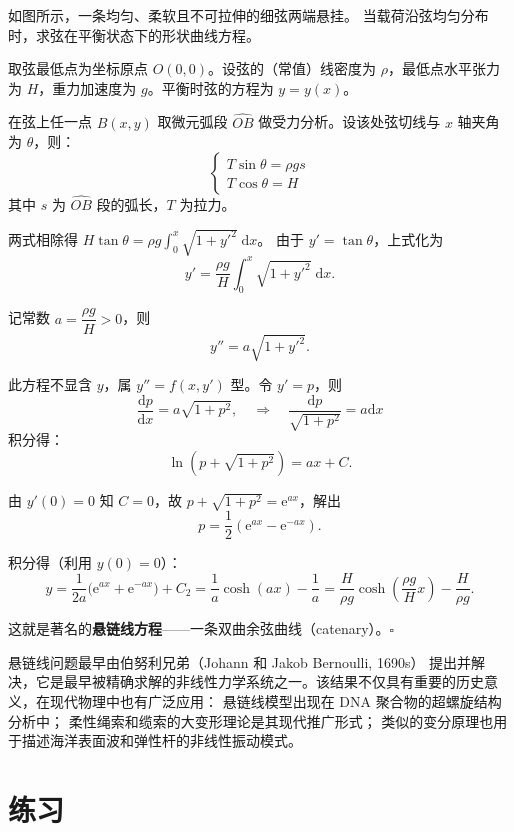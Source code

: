 \documentclass[lang=cn,11pt]{elegantbook}
\begin{document}
\begin{exercise}[悬链线的形状] 
如图所示，一条均匀、柔软且不可拉伸的细弦两端悬挂。
当载荷沿弦均匀分布时，求弦在平衡状态下的形状曲线方程。
\end{exercise}

\begin{solution}
取弦最低点为坐标原点 $O(0,0)$。设弦的（常值）线密度为 $\rho$，最低点水平张力为 $H$，重力加速度为 $g$。平衡时弦的方程为 $y=y(x)$。

在弦上任一点 $B(x,y)$ 取微元弧段 $\widehat{OB}$ 做受力分析。设该处弦切线与 $x$ 轴夹角为 $\theta$，则：
\[
\begin{cases}
T\sin\theta = \rho g s \\
T\cos\theta = H
\end{cases}
\]
其中 $s$ 为 $\widehat{OB}$ 段的弧长，$T$ 为拉力。

两式相除得 $H\tan\theta=\rho g\displaystyle\int_{0}^{x}\sqrt{1+y'^{2}}\;\mathrm{d}x$。
由于 $y'=\tan\theta$，上式化为
\[
y'=\frac{\rho g}{H}\int_{0}^{x}\sqrt{1+y'^{2}}\;\mathrm{d}x.
\]

记常数 $a=\dfrac{\rho g}{H}>0$，则
\[
y''=a\sqrt{1+y'^{2}}. \tag{††}
\]

此方程不显含 $y$，属 $y''=f(x,y')$ 型。令 $y'=p$，则
\[
\frac{\mathrm{d}p}{\mathrm{d}x}=a\sqrt{1+p^{2}},\quad
\Longrightarrow\quad
\frac{\mathrm{d}p}{\sqrt{1+p^{2}}} = a\mathrm{d}x
\]
积分得：
\[
\ln(p+\sqrt{1+p^{2}})=ax+C.
\]

由 $y'(0)=0$ 知 $C=0$，故 $p+\sqrt{1+p^{2}}=\mathrm{e}^{ax}$，解出
\[
p=\dfrac12(\mathrm{e}^{ax}-\mathrm{e}^{-ax}).
\]

积分得（利用 $y(0)=0$）：
\[
y=\frac1{2a}\bigl(\mathrm{e}^{ax}+\mathrm{e}^{-ax}\bigr)+C_2
=\frac1a\cosh(ax)-\frac{1}{a}
=\frac{H}{\rho g}\cosh\!\left(\frac{\rho g}{H}x\right)-\frac{H}{\rho g}.
\]

这就是著名的\textbf{悬链线方程}——一条双曲余弦曲线（catenary）。\hfill$\square$
\end{solution}

\begin{remark}
悬链线问题最早由伯努利兄弟（Johann 和 Jakob Bernoulli, 1690s）
提出并解决，它是最早被精确求解的非线性力学系统之一。该结果不仅具有重要的历史意义，在现代物理中也有广泛应用：
悬链线模型出现在 DNA 聚合物的超螺旋结构分析中；
柔性绳索和缆索的大变形理论是其现代推广形式；
类似的变分原理也用于描述海洋表面波和弹性杆的非线性振动模式。
\end{remark}


\section{练习}
\end{document}
